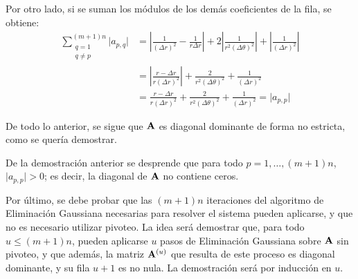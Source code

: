 \begin{enumerate}[label=(\roman*)]
            Por otro lado, si se suman los módulos de los demás coeficientes de la fila, se obtiene:
                \[ \begin{split}
                    \sum_{\substack{q=1 \\ q \neq p}}^{(m+1)n} \vert a_{p,q} \vert &= \left \vert \frac{1}{(\Delta r)^2} - \frac{1}{r \Delta r} \right \vert + 2 \left \vert \frac{1}{r^2 (\Delta \theta)^2} \right \vert + \left \vert \frac{1}{(\Delta r)^2} \right \vert \\
                    &= \left \vert \frac{r - \Delta r}{r (\Delta r)^2} \right \vert + \frac{2}{r^2 (\Delta \theta)^2} + \frac{1}{(\Delta r)^2} \\
                    &= \frac{r - \Delta r}{r (\Delta r)^2} + \frac{2}{r^2 (\Delta \theta)^2} + \frac{1}{(\Delta r)^2} = \vert a_{p,p} \vert
                \end{split} \]
        \end{enumerate}

        De todo lo anterior, se sigue que $\mathbf{A}$ es diagonal dominante de forma no estricta, como se quería demostrar.

        \begin{obs} \label{obs:Diagonal de A sin ceros}
        De la demostración anterior se desprende que para todo $p = 1, \dots, (m+1)n$, $\vert a_{p,p} \vert > 0$; es decir, la diagonal de $\mathbf{A}$ no contiene ceros.
        \end{obs}

        Por último, se debe probar que las $(m+1)n$ iteraciones del algoritmo de Eliminación Gaussiana necesarias para resolver el sistema pueden aplicarse, y que no es necesario utilizar pivoteo. La idea será demostrar que, para todo $u \leq (m+1)n$, pueden aplicarse $u$ pasos de Eliminación Gaussiana sobre $\mathbf{A}$ sin pivoteo, y que además, la matriz $\mathbf{A}^{(u)}$ que resulta de este proceso es diagonal dominante, y su fila $u + 1$ es no nula. La demostración será por inducción en $u$.

